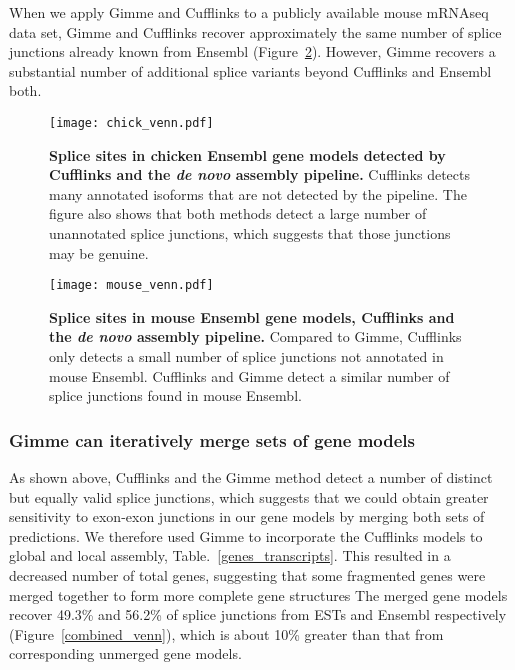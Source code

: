 When we apply Gimme and Cufflinks to a publicly available mouse mRNAseq data
set, Gimme and Cufflinks recover approximately the same number of splice
junctions already known from Ensembl (Figure~\ref{mus_venn}).  However, Gimme
recovers a substantial number of additional splice variants beyond Cufflinks and
Ensembl both.

\clearpage\pagestyle{lscape}
\begin{landscape}
\begin{figure}[!ht]
\begin{center}
\texttt{[image: chick\_venn.pdf]}
\end{center}
\caption{
\textbf{Splice sites in chicken Ensembl gene models detected by Cufflinks and the
{\em de novo} assembly pipeline.} Cufflinks detects many annotated isoforms
that are not detected by the pipeline.  The figure also shows that both methods
detect a large number of unannotated splice junctions, which suggests that those
junctions may be genuine.  }
\label{chick_venn}
\end{figure}

\begin{figure}[!ht]
\begin{center}
\texttt{[image: mouse\_venn.pdf]}
\end{center}
\caption{
    \textbf{Splice sites in mouse Ensembl gene models, Cufflinks and
    the \emph{de novo} assembly pipeline.}
    Compared to Gimme, Cufflinks only detects a small number of
    splice junctions not annotated in mouse Ensembl.  Cufflinks
    and Gimme detect a similar number of splice junctions found
    in mouse Ensembl.
}
\label{mus_venn}
\end{figure}
\end{landscape}
\pagestyle{plain}

\subsubsection{Gimme can iteratively merge sets of gene models}

As shown above, Cufflinks and the Gimme method detect a number of
distinct but equally valid splice junctions, which suggests that
we could obtain greater sensitivity to exon-exon junctions in our
gene models by merging both sets of predictions.  We therefore
used Gimme to incorporate the Cufflinks models to global and
local assembly, Table.~\ref{genes_transcripts}.  This resulted in
a decreased number of total genes, suggesting that some
fragmented genes were merged together to form more complete gene
structures The merged gene models recover 49.3\% and 56.2\% of
splice junctions from ESTs and Ensembl respectively
(Figure~\ref{combined_venn}), which is about 10\% greater than
that from corresponding unmerged gene models.

